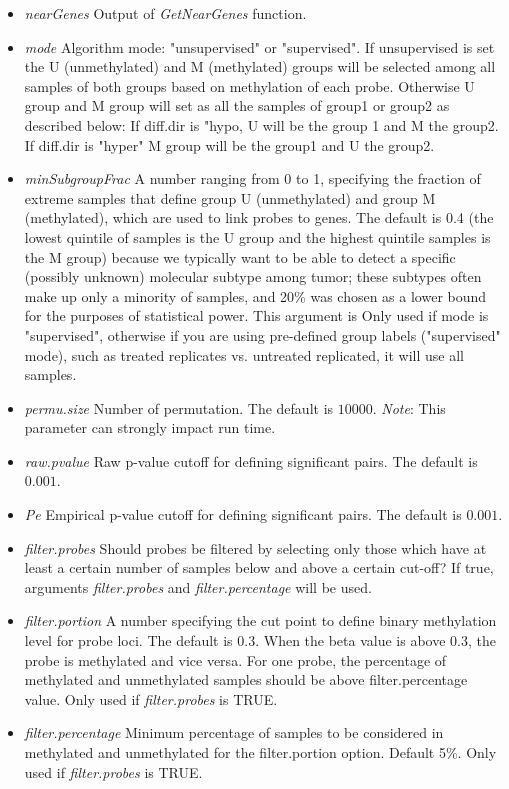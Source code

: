 \begin{itemize}
\item \textit{nearGenes} Output of \textit{GetNearGenes} function.
\item  \textit{mode} Algorithm mode: "unsupervised" or "supervised". If unsupervised is set
the U (unmethylated) and M (methylated) groups will be selected 
among all samples of both groups based on methylation of each probe.
Otherwise U group and M group will set as all the samples of group1 or group2 as described below:
If diff.dir is "hypo, U will be the group 1 and M the group2.
If diff.dir is "hyper" M group will be the group1 and U the group2.
\item \textit{minSubgroupFrac} A number ranging from 0 to 1, specifying the fraction of extreme  samples that define group U (unmethylated) and group M (methylated), which are used to link probes to genes. The default is 0.4 (the lowest quintile of samples is the U group and the highest quintile samples is the M group) because we typically want to be able to detect a specific (possibly unknown) molecular subtype among tumor; these subtypes often make up only a minority of samples, and 20\% was chosen as a lower bound for the purposes of statistical power. This argument is Only used if mode is "supervised", otherwise if you are using pre-defined group labels ("supervised" mode), such as treated replicates vs. untreated replicated, it will use all samples.
\item  \textit{permu.size} Number of permutation. The default is $10000$. \textit{Note}: This parameter can strongly impact run time.
\item \textit{raw.pvalue} Raw p-value cutoff for defining significant pairs. The default is $0.001$. 
\item \textit{Pe} Empirical p-value cutoff for defining significant pairs. The default is $0.001$.
\item \textit{filter.probes} Should probes be filtered  by selecting only those which have at least a certain number of samples below and above a certain cut-off? If true, arguments \textit{filter.probes} and \textit{filter.percentage} will be used.
\item  \textit{filter.portion}	A number specifying the cut point to define binary methylation level for probe loci. The default is 0.3. When the beta value is above 0.3, the probe is methylated and vice versa. For one probe, the percentage of methylated and unmethylated samples should be above filter.percentage value. Only used if \textit{filter.probes} is TRUE. 
\item  \textit{filter.percentage}	Minimum percentage of samples to be considered in methylated and unmethylated for the filter.portion option. Default 5\%. Only used if \textit{filter.probes} is TRUE. 
\end{itemize}


